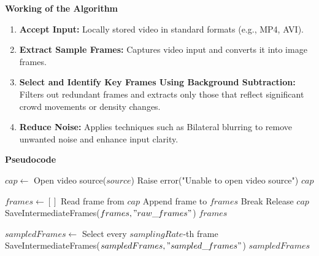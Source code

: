 \documentclass[11pt]{report}
\begin{document}
\textbf{Working of the Algorithm}  
\begin{enumerate} 
    \item \textbf{Accept Input:} Locally stored video in standard formats (e.g., MP4, AVI). 
    \item \textbf{Extract Sample Frames:} Captures video input and converts it into image frames. 
    \item \textbf{Select and Identify Key Frames Using Background Subtraction:} Filters out redundant frames and extracts only those that reflect significant crowd movements or density changes.
    \item \textbf{Reduce Noise:} Applies techniques such as Bilateral blurring to remove unwanted noise and enhance input clarity. 
\end{enumerate}

\textbf{Pseudocode}
\begin{algorithm}[H]
    \caption{Capture Video}
\begin{algorithmic}[1]
    \State $cap \gets$ Open video source($source$)
        \State Raise error("Unable to open video source")
    \EndIf
    \State \Return $cap$
\EndFunction
\end{algorithmic}
\end{algorithm}

\begin{algorithm}[H]
\caption{Extract Frames from Video}
\begin{algorithmic}[1]
    \State $frames \gets []$
        \State Read frame from $cap$
            \State Append frame to $frames$
        \Else
            \State Break
        \EndIf
    \EndWhile
    \State Release $cap$
    \State SaveIntermediateFrames($frames, "raw\_frames"$)
    \State \Return $frames$
\EndFunction
\end{algorithmic}
\end{algorithm}

\begin{algorithm}[H]
\caption{Sample Frames}
\begin{algorithmic}[1]
    \State $sampledFrames \gets$ Select every $samplingRate$-th frame
    \State SaveIntermediateFrames($sampledFrames, "sampled\_frames"$)
    \State \Return $sampledFrames$
\EndFunction
\end{algorithmic}
\end{algorithm}
\end{document}
